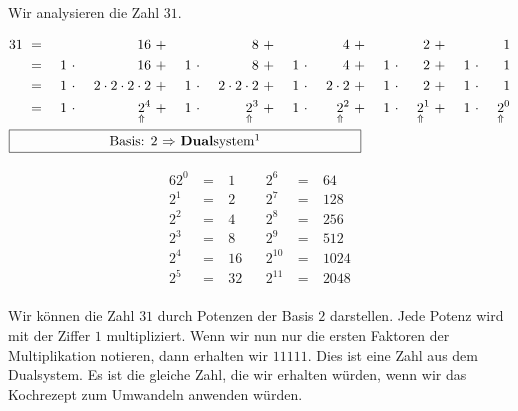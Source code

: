 \begin{example}

Wir analysieren die Zahl $31$.

\begin{minipage}{0.6\textwidth}
\begin{alignat*}{16}
31 & ~ = ~ & & & 16 & ~ + ~ & & & 8 & ~ + ~ & & & 4 & ~ + ~ & & & 2 & ~ + ~ & & & 1 \\
& ~ = ~ & 1 & ~\cdot~ & 16 & ~ + ~ & 1 & ~\cdot~ & 8 & ~ + ~ & 1 & ~\cdot~ & 4 & ~ + ~ & 1 & ~\cdot~ & 2 & ~ + ~ & 1 & ~\cdot~ & 1 \\
& ~ = ~ & 1 & ~\cdot~ & 2 \cdot 2 \cdot 2 \cdot 2  & ~ + ~ & 1 & ~\cdot~ & 2 \cdot 2 \cdot 2  & ~ + ~ & 1 & ~\cdot~ & 2 \cdot 2 & ~ + ~ & 1 & ~\cdot~ & 2 & ~ + ~ & 1 & ~\cdot~ & 1 \\
& ~ = ~ & 1 & ~\cdot~ & \underset{\Uparrow}{2}^4  & ~ + ~ & 1 & ~\cdot~ & \underset{\Uparrow}{2}^3  & ~ + ~ & 1 & ~\cdot~ & \underset{\Uparrow}{2}^2 & ~ + ~ & 1 & ~\cdot~ & \underset{\Uparrow}{2}^1 & ~ + ~ & 1 & ~\cdot~ & \underset{\Uparrow}{2}^0 \\
\omit\rlap{\framebox[9cm]{Basis: $2$ $\Rightarrow$ \textbf{Dual}system\footnotemark}}
\end{alignat*}
\end{minipage}
\hfill
\begin{minipage}{0.35\textwidth}
\begin{alignat*}{6}
2^0 & ~ = ~ & 1 & ~~~~ 	2^6 & ~ = ~ & 64  \\
2^1 & ~ = ~ & 2	 & ~~~~	2^7 & ~ = ~ & 128  \\
2^2 & ~ = ~ & 4	 & ~~~~	2^8 & ~ = ~ & 256  \\
2^3 & ~ = ~ & 8	 & ~~~~	2^9 & ~ = ~ & 512  \\
2^4 & ~ = ~ & 16 &~~~~ 	2^{10} & ~ = ~ & 1024  \\
2^5 & ~ = ~ & 32 &~~~~ 	2^{11} & ~ = ~ & 2048  \\
\end{alignat*}
\end{minipage}
Wir können die Zahl $31$ durch Potenzen der Basis $2$ darstellen. Jede Potenz wird mit der Ziffer $1$ multipliziert. Wenn wir nun nur die ersten Faktoren der Multiplikation notieren, dann erhalten wir $11111$. Dies ist eine Zahl aus dem Dualsystem. Es ist die gleiche Zahl, die wir erhalten würden, wenn wir das Kochrezept zum Umwandeln anwenden würden.

\end{example}



